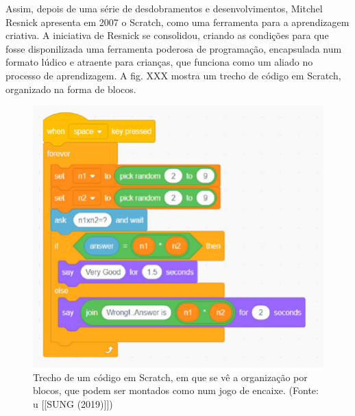 \documentclass[
12pt,		%
openright,	%
twoside,  %
a4paper,			%
chapter=TITLE,		%
english,			%
french,				%
spanish,			%
brazil				%
]{USPSC-classe/USPSC}
\begin{document}
Assim, depois de uma s\'erie de desdobramentos e desenvolvimentos, Mitchel Resnick apresenta em 2007 o Scratch, como uma ferramenta para a aprendizagem criativa. A iniciativa de Resnick se consolidou, criando as condi\c{c}\~oes para que fosse disponilizada uma ferramenta poderosa de programa\c{c}\~ao, encapsulada num formato l\'udico e atraente para crian\c{c}as, que funciona como um aliado no processo de aprendizagem. A fig. XXX mostra um trecho de c\'odigo em Scratch, organizado na forma de blocos.











\captionsetup{format=plain}
\begin{figure}[max size={\textwidth}{\textheight}]

\centering


\begin{minipage}[b]{0.4\linewidth}
        \centering
                \includegraphics[width=1.0\linewidth]{../../imagens/Scratch-Block.png}
                \caption{Trecho de um c\'odigo em Scratch, em que se v\^e a organiza\c{c}\~ao por blocos, que podem ser montados como num jogo de encaixe. (Fonte: u [[SUNG (2019)]])}
                \label{5cac9c9edeb34a88b5571069bb494cda1ce1bd9c}
\end{minipage}%
\hspace{0.5cm}
\end{figure}
\end{document}
